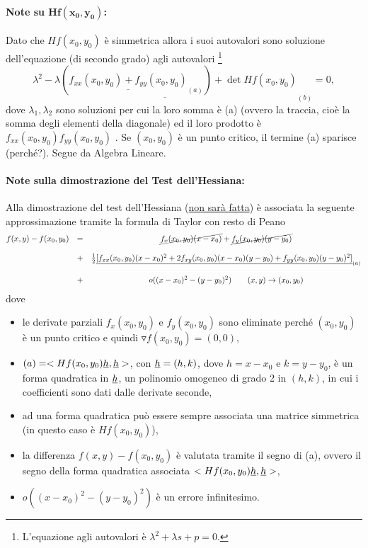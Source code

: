 \paragraph{Note su $\boldsymbol{Hf(x_0,y_0)}$:} Dato che $Hf(x_0,y_0)$ è simmetrica allora i suoi autovalori sono soluzione dell'equazione (di secondo grado) agli autovalori \footnote{L'equazione agli autovalori è $\lambda^2 + \lambda s + p = 0$.}
\begin{equation*}
	\underline{\lambda^2 - \lambda(\underline{f_{xx}(x_0,y_0) + f_{yy}(x_0,y_0)}_{(a)}) + \det Hf(x_0, y_0)}_{(b)} = 0,
\end{equation*}
dove $\lambda_1,\lambda_2$ sono soluzioni per cui la loro somma è (a) (ovvero la traccia, cioè la somma degli elementi della diagonale) ed il loro prodotto è $f_{xx}(x_0,y_0)f_{yy}(x_0,y_0)$ . Se $(x_0, y_0)$ è un punto critico, il termine (a) sparisce (perché?). Segue da Algebra Lineare.

\paragraph{Note sulla dimostrazione del Test dell'Hessiana:} Alla dimostrazione del test dell'Hessiana (\ul{non sarà fatta}) è associata la seguente approssimazione tramite la formula di Taylor con resto di Peano
\begin{equation}\label{eq:approssimazione_taylor_resto_peano_dim_test_hessiana}
	\begin{matrix}
		f(x,y) - f(x_0,y_0) &=& \cancel{f_x(x_0,y_0)(x-x_0)} + \cancel{f_y(x_0, y_0)(y-y_0)}\\\\
	&+& \frac{1}{2} \underline{[f_{xx}(x_0,y_0)(x-x_0)^2 + 2f_{xy}(x_0,y_0)(x-x_0)(y-y_0) + f_{yy}(x_0,y_0)(y-y_0)^2]}_{(a)}\\\\
	 &+& o((x-x_0)^2-(y-y_0)^2) \qquad (x,y)\rightarrow(x_0,y_0)
	\end{matrix}
\end{equation}
dove
\begin{itemize}
	\item le derivate parziali $f_x(x_0, y_0)$ e $f_y(x_0, y_0)$ sono eliminate perché $(x_0,y_0)$ è un punto critico e quindi $\triangledown f(x_0,y_0) =(0,0)$,
	\item $(a)=<Hf(x_0,y_0)\uline h,\uline h>$, con $\uline h=(h,k)$, dove $h=x-x_0$ e $k=y-y_0$, è un forma quadratica in $\uline h$, un polinomio omogeneo di grado 2 in $(h,k)$, in cui i coefficienti sono dati dalle derivate seconde,
	\item ad una forma quadratica può essere sempre associata una matrice simmetrica (in questo caso è $Hf(x_0,y_0)$),
	\item la differenza $f(x,y) - f(x_0,y_0)$ è valutata tramite il segno di (a), ovvero il segno della forma quadratica associata $<Hf(x_0,y_0)\uline h,\uline h>$,
	\item $o((x-x_0)^2-(y-y_0)^2)$ è un errore infinitesimo.
\end{itemize}


